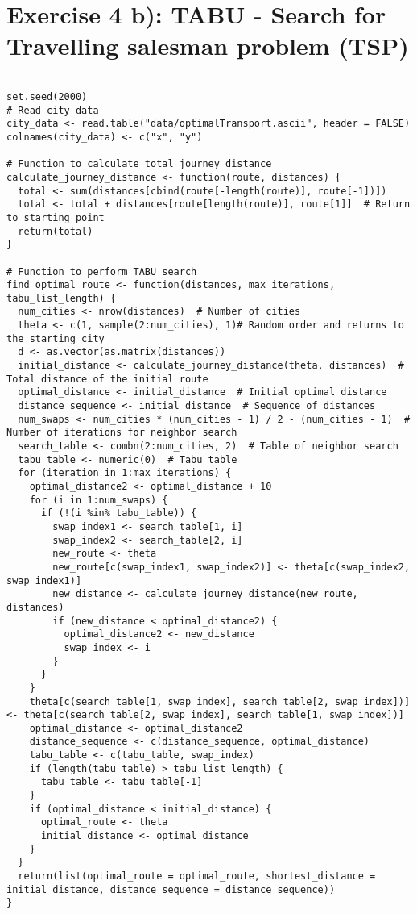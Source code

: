\section*{Exercise 4 b): TABU - Search for Travelling salesman problem (TSP)}
\begin{tcolorbox}[colback=white!95!black,colframe=white!50!black,breakable]
\begin{lstlisting}[caption={Exercise 4b}, label={lst:tabu}]

set.seed(2000)
# Read city data
city_data <- read.table("data/optimalTransport.ascii", header = FALSE)
colnames(city_data) <- c("x", "y")

# Function to calculate total journey distance
calculate_journey_distance <- function(route, distances) {
  total <- sum(distances[cbind(route[-length(route)], route[-1])])
  total <- total + distances[route[length(route)], route[1]]  # Return to starting point
  return(total)
}

# Function to perform TABU search
find_optimal_route <- function(distances, max_iterations, tabu_list_length) {
  num_cities <- nrow(distances)  # Number of cities
  theta <- c(1, sample(2:num_cities), 1)# Random order and returns to the starting city
  d <- as.vector(as.matrix(distances))
  initial_distance <- calculate_journey_distance(theta, distances)  # Total distance of the initial route
  optimal_distance <- initial_distance  # Initial optimal distance
  distance_sequence <- initial_distance  # Sequence of distances
  num_swaps <- num_cities * (num_cities - 1) / 2 - (num_cities - 1)  # Number of iterations for neighbor search
  search_table <- combn(2:num_cities, 2)  # Table of neighbor search
  tabu_table <- numeric(0)  # Tabu table
  for (iteration in 1:max_iterations) {
    optimal_distance2 <- optimal_distance + 10
    for (i in 1:num_swaps) {
      if (!(i %in% tabu_table)) {
        swap_index1 <- search_table[1, i]
        swap_index2 <- search_table[2, i]
        new_route <- theta
        new_route[c(swap_index1, swap_index2)] <- theta[c(swap_index2, swap_index1)]
        new_distance <- calculate_journey_distance(new_route, distances)
        if (new_distance < optimal_distance2) {
          optimal_distance2 <- new_distance
          swap_index <- i
        }
      }
    }
    theta[c(search_table[1, swap_index], search_table[2, swap_index])] <- theta[c(search_table[2, swap_index], search_table[1, swap_index])]
    optimal_distance <- optimal_distance2
    distance_sequence <- c(distance_sequence, optimal_distance)
    tabu_table <- c(tabu_table, swap_index)
    if (length(tabu_table) > tabu_list_length) {
      tabu_table <- tabu_table[-1]
    }
    if (optimal_distance < initial_distance) {
      optimal_route <- theta
      initial_distance <- optimal_distance
    }
  }
  return(list(optimal_route = optimal_route, shortest_distance = initial_distance, distance_sequence = distance_sequence))
}



\end{lstlisting}
\end{tcolorbox}
